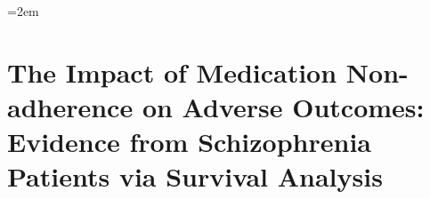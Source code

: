 \begingroup
\ChThreeBeginLabels
\emergencystretch=2em
\chapter{The Impact of Medication Non-adherence on Adverse Outcomes: Evidence from Schizophrenia Patients via Survival Analysis}\label{chap:ch03}

% 














% 

\clearpage
\ChThreeEndLabels
\endgroup
